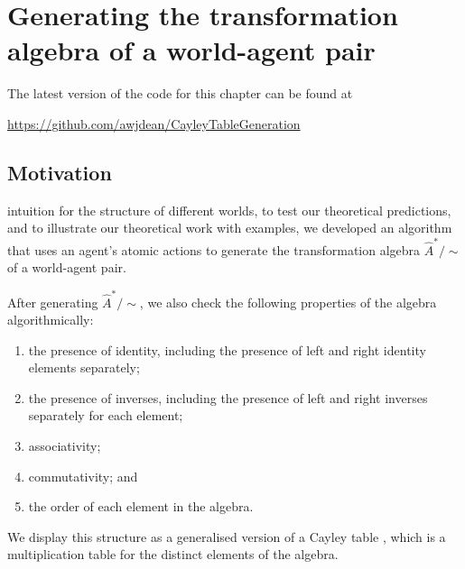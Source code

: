 \chapter{
Generating the transformation algebra of a world-agent pair
}

The latest version of the code for this chapter can be found at
\begin{center}
    \url{https://github.com/awjdean/CayleyTableGeneration}
\end{center}

\section{Motivation}

 intuition for the structure of different worlds, to test our theoretical predictions, and to illustrate our theoretical work with examples, we developed an algorithm that uses an agent’s atomic actions to generate the transformation algebra $\hat{A}^{*}/\sim$ of a world-agent pair.

After generating $\hat{A}^{*}/\sim$, we also check the following properties of the algebra algorithmically:
\begin{enumerate}
    \item the presence of identity, including the presence of left and right identity elements separately;
    \item the presence of inverses, including the presence of left and right inverses separately for each element;
    \item associativity;
    \item commutativity; and
    \item the order of each element in the algebra.
\end{enumerate}
We display this structure as a generalised version of a Cayley table \autocite{cayley1854theory}, which is a multiplication table for the distinct elements of the algebra.

